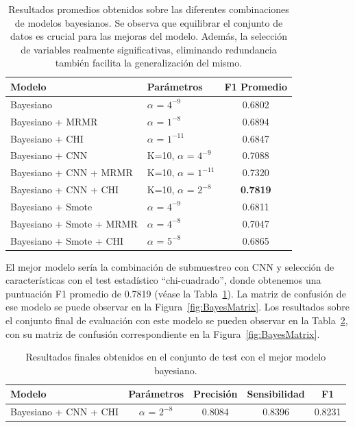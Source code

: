 \documentclass[12pt,letterpaper]{article}
\begin{document}
\begin{table}[!ht]
    \centering
    \begin{tabular}{llc}
        \hline
        \textbf{Modelo} & \textbf{Parámetros} &\textbf{F1 Promedio} \\\hline
        Bayesiano & $\alpha$ = $4^{-9}$ & 0.6802 \\ 
        Bayesiano + MRMR & $\alpha$ = $1^{-8}$ & 0.6894 \\ 
        Bayesiano + CHI & $\alpha$ = $1^{-11}$ & 0.6847 \\ 
        Bayesiano + CNN & K=10, $\alpha$ = $4^{-9}$ & 0.7088\\ 
        Bayesiano + CNN + MRMR & K=10, $\alpha$ = $1^{-11}$ & 0.7320 \\ 
        Bayesiano + CNN + CHI & K=10, $\alpha$ = $2^{-8}$ & \textbf{0.7819} \\ 
        Bayesiano + Smote & $\alpha$ = $4^{-9}$ & 0.6811 \\ 
        Bayesiano + Smote + MRMR & $\alpha$ = $4^{-8}$ & 0.7047 \\ 
        Bayesiano + Smote + CHI & $\alpha$ = $5^{-8}$ & 0.6865 \\ 
        \hline
    \end{tabular}
    \caption{Resultados promedios obtenidos sobre las diferentes combinaciones de modelos bayesianos. Se observa que equilibrar el conjunto de datos es crucial para las mejoras del modelo. Además, la selección de variables realmente significativas, eliminando redundancia también facilita la generalización del mismo. }
    \label{tab:BayesResults}
\end{table}
El mejor modelo sería la combinación de submuestreo con CNN y selección de características con el test estadístico ``chi-cuadrado'', donde obtenemos una puntuación F1 promedio de 0.7819 (véase la Tabla~\ref{tab:BayesResults}).
La matriz de confusión de ese modelo se puede observar en la Figura~\ref{fig:BayesMatrix}. Los resultados sobre el conjunto final de evaluación con este modelo se pueden observar en la Tabla~\ref{tab:BayesFinalResults}, con su matriz de confusión correspondiente en la Figura~\ref{fig:BayesMatrix}.


\begin{table}[!ht]
    \centering
    \begin{tabular}{lcccc}
        \hline
        \textbf{Modelo} & \textbf{Parámetros} &\textbf{Precisión} &\textbf{Sensibilidad} &\textbf{F1} \\\hline
        Bayesiano + CNN + CHI & $\alpha$ = $2^{-8}$ & 0.8084 & 0.8396 & 0.8231\\ 
        \hline
    \end{tabular}
    \caption{Resultados finales obtenidos en el conjunto de test con el mejor modelo bayesiano.}
    \label{tab:BayesFinalResults}
\end{table}
\end{document}
